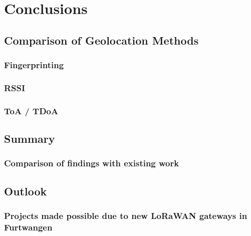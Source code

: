 \chapter{Conclusions}

\section{Comparison of Geolocation Methods}


\subsection{Fingerprinting}

\subsection{\acf{RSSI}}

\subsection{\acf{ToA} / \acf{TDoA}}


\section{Summary}


\subsection{Comparison of findings with existing work}


\section{Outlook}


\subsection{Projects made possible due to new \acs{LoRaWAN} gateways in Furtwangen}

